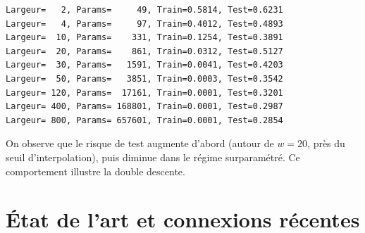 \begin{codeoutput}
\begin{verbatim}
Largeur=   2, Params=     49, Train=0.5814, Test=0.6231
Largeur=   4, Params=     97, Train=0.4012, Test=0.4893
Largeur=  10, Params=    331, Train=0.1254, Test=0.3891
Largeur=  20, Params=    861, Train=0.0312, Test=0.5127
Largeur=  30, Params=   1591, Train=0.0041, Test=0.4203
Largeur=  50, Params=   3851, Train=0.0003, Test=0.3542
Largeur= 120, Params=  17161, Train=0.0001, Test=0.3201
Largeur= 400, Params= 168801, Train=0.0001, Test=0.2987
Largeur= 800, Params= 657601, Train=0.0001, Test=0.2854
\end{verbatim}
\end{codeoutput}

\begin{remarque}
On observe que le risque de test augmente d'abord (autour de $w = 20$,
pr\`es du seuil d'interpolation), puis diminue dans le r\'egime
surparam\'etr\'e. Ce comportement illustre la double descente.
\end{remarque}

\section{\'Etat de l'art et connexions r\'ecentes}
\label{sec:theorie-sota}

